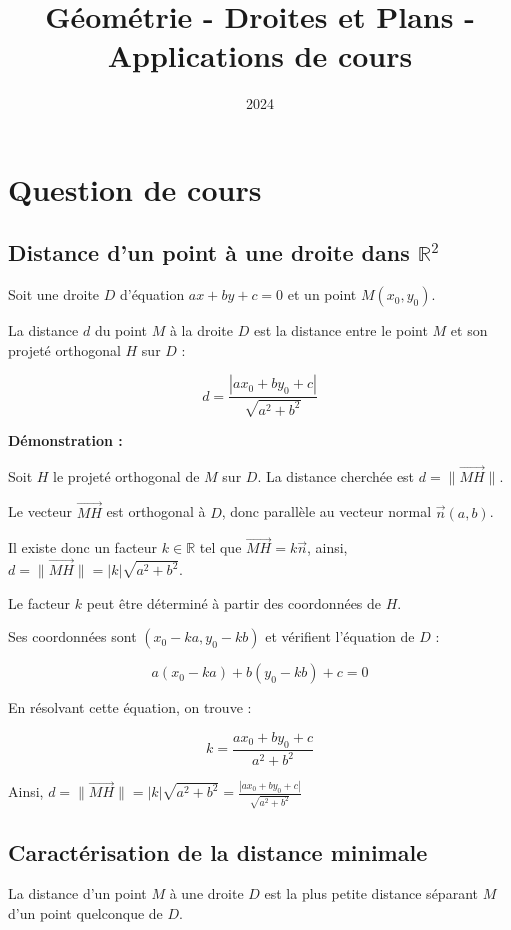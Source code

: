 \documentclass[10pt,a4paper]{article}
\title{Géométrie - Droites et Plans - Applications de cours}
\author{}
\date{2024}
\begin{document}
\maketitle

\section*{Question de cours}

\subsection*{Distance d'un point à une droite dans $\mathbb{R}^2$}

Soit une droite $D$ d'équation $ax + by + c = 0$ et un point $M(x_0, y_0)$.

La distance $d$ du point $M$ à la droite $D$ est la distance entre le point $M$ et son projeté
orthogonal $H$ sur $D$ :

$$ d = \frac{|ax_0 + by_0 + c|}{\sqrt{a^2 + b^2}} $$

\textbf{Démonstration :}

Soit $H$ le projeté orthogonal de $M$ sur $D$. La distance cherchée est $d = \|\vec{MH}\|$.

Le vecteur $\vec{MH}$ est orthogonal à $D$, donc parallèle au vecteur normal $\vec{n}(a,b)$.

Il existe donc un facteur $k \in \mathbb{R}$ tel que $\vec{MH} = k\vec{n}$,
ainsi, $d = \|\vec{MH}\| = |k|\sqrt{a^2 + b^2}$.

Le facteur $k$ peut être déterminé à partir des coordonnées de $H$.

Ses coordonnées sont $(x_0 - ka, y_0 - kb)$ et vérifient l'équation de $D$ :

$$ a(x_0 - ka) + b(y_0 - kb) + c = 0 $$

En résolvant cette équation, on trouve :

$$ k = \frac{ax_0 + by_0 + c}{a^2 + b^2} $$

Ainsi, $d = \|\vec{MH}\| = |k|\sqrt{a^2 + b^2} = \frac{|ax_0 + by_0 + c|}{\sqrt{a^2 + b^2}}$

\subsection*{Caractérisation de la distance minimale}

La distance d'un point $M$ à une droite $D$ est la plus petite distance séparant $M$ d'un point quelconque de $D$.
\end{document}

